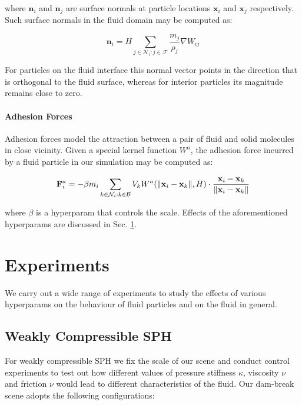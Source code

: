 \documentclass[
	11pt, 
	DIV10,
	ngerman,
	a4paper, 
	oneside, 
	headings=normal, 
	captions=tableheading,
	final, 
	numbers=noenddot
]{scrartcl}
\DeclarePairedDelimiter{\norm}{\lVert}{\rVert}
\begin{document}
where $ \mathbf{n}_{i} $ and $ \mathbf{n}_{j} $ are surface normals at particle locations $ \mathbf{x}_{i} $ and $ \mathbf{x}_{j} $ respectively. Such surface normals in the fluid domain may be computed as:

\begin{equation}
	\label{eq27}
	\mathbf{n}_{i} = H \sum_{j \in \mathcal{N}_{i}:j \in \mathcal{F}} \frac{m_{j}}{\rho_{j}} \nabla W_{ij}
\end{equation}

For particles on the fluid interface this normal vector points in the direction that is orthogonal to the fluid surface, whereas for interior particles its magnitude remains close to zero.

\paragraph{Adhesion Forces}

Adhesion forces model the attraction between a pair of fluid and solid molecules in close vicinity. Given a special kernel function $ W^{a} $, the adhesion force incurred by a fluid particle in our simulation may be computed as:

\begin{equation}
	\label{28}
	\mathbf{F}_{i}^{a} = - \beta m_{i} \sum_{k \in \mathcal{N}_{i}:k \in \mathcal{B}} V_{k} W^{a}(\norm{\mathbf{x}_{i} - \mathbf{x}_{k}}, H) \cdot \frac{\mathbf{x}_{i} - \mathbf{x}_{k}}{\norm{\mathbf{x}_{i} - \mathbf{x}_{k}}}
\end{equation}

where $ \beta $ is a hyperparam that controls the scale. Effects of the aforementioned hyperparams are discussed in Sec. \ref{sec4}.

\section{Experiments}
\label{sec4}

We carry out a wide range of experiments to study the effects of various hyperparams on the behaviour of fluid particles and on the fluid in general.

\subsection{Weakly Compressible SPH}

For weakly compressible SPH we fix the scale of our scene and conduct control experiments to test out how different values of pressure stiffness $ \kappa $, viscosity $ \nu $ and friction $ \nu$ would lead to different characteristics of the fluid. Our dam-break scene adopts the following configurations:
\end{document}
